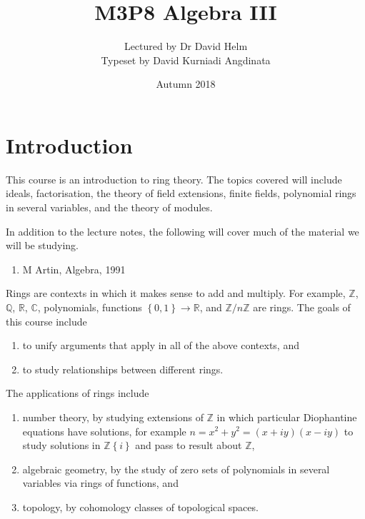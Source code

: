 \documentclass{article}
\title{M3P8 Algebra III}
\author{Lectured by Dr David Helm \\ Typeset by David Kurniadi Angdinata}
\date{Autumn 2018}
\newcommand{\Z}{\mathbb{Z}}
\newcommand{\Q}{\mathbb{Q}}
\newcommand{\R}{\mathbb{R}}
\newcommand{\C}{\mathbb{C}}
\newcommand{\rb}[1]{\left( #1 \right)}
\newcommand{\cb}[1]{\left\{ #1 \right\}}
\theoremstyle{definition}\newtheorem{definition}{Definition}[subsection]
\theoremstyle{definition}\newtheorem{remark}[definition]{Remark}
\theoremstyle{definition}\newtheorem*{example}{Example}
\theoremstyle{definition}\newtheorem*{note}{Note}
\begin{document}
\maketitle

\vfill

\tableofcontents

\pagebreak


\section{Introduction}

This course is an introduction to ring theory. The topics covered will include ideals, factorisation, the theory of field extensions, finite fields, polynomial rings in several variables, and the theory of modules.

In addition to the lecture notes, the following will cover much of the material we will be studying.

\begin{enumerate}
\item M Artin, Algebra, 1991
\end{enumerate}

Rings are contexts in which it makes sense to add and multiply. For example, $ \Z $, $ \Q $, $ \R $, $ \C $, polynomials, functions $ \cb{0, 1} \to \R $, and $ \Z / n\Z $ are rings. The goals of this course include
\begin{enumerate}
\item to unify arguments that apply in all of the above contexts, and
\item to study relationships between different rings.
\end{enumerate}
The applications of rings include
\begin{enumerate}
\item number theory, by studying extensions of $ \Z $ in which particular Diophantine equations have solutions, for example $ n = x^2 + y^2 = \rb{x + iy}\rb{x - iy} $ to study solutions in $ \Z\cb{i} $ and pass to result about $ \Z $,
\item algebraic geometry, by the study of zero sets of polynomials in several variables via rings of functions, and
\item topology, by cohomology classes of topological spaces.
\end{enumerate}
\end{document}
